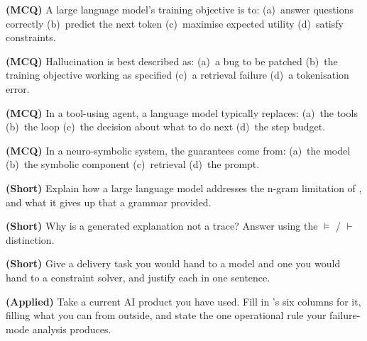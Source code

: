 \begin{reviewq}
  \item \textbf{(MCQ)} A large language model's training objective is to:
        (a)~answer questions correctly (b)~predict the next token
        (c)~maximise expected utility (d)~satisfy constraints.
  \item \textbf{(MCQ)} Hallucination is best described as: (a)~a bug to be patched
        (b)~the training objective working as specified (c)~a retrieval failure
        (d)~a tokenisation error.
  \item \textbf{(MCQ)} In a tool-using agent, a language model typically replaces:
        (a)~the tools (b)~the loop (c)~the decision about what to do next
        (d)~the step budget.
  \item \textbf{(MCQ)} In a neuro-symbolic system, the guarantees come from:
        (a)~the model (b)~the symbolic component (c)~retrieval (d)~the prompt.
  \item \textbf{(Short)} Explain how a large language model addresses the n-gram
        limitation of , and what it gives up that a grammar provided.
  \item \textbf{(Short)} Why is a generated explanation not a trace? Answer using
        the $\models$ / $\vdash$ distinction.
  \item \textbf{(Short)} Give a delivery task you would hand to a model and one you
        would hand to a constraint solver, and justify each in one sentence.
  \item \textbf{(Applied)} Take a current AI product you have used. Fill in
        's six columns for it, filling what you can from outside,
        and state the one operational rule your failure-mode analysis produces.
\end{reviewq}
